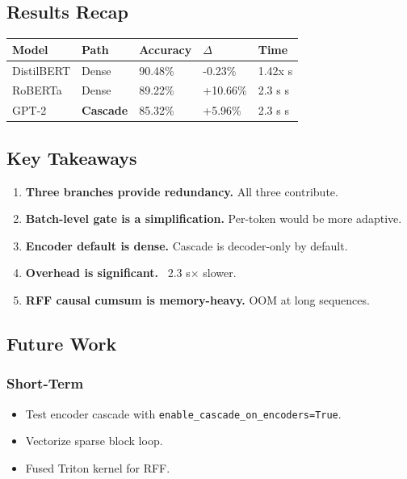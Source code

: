 \subsection{Results Recap}

\begin{table}[H]
\centering
\small
\begin{tabular}{lllll}
\toprule
\textbf{Model} & \textbf{Path} & \textbf{Accuracy} & \textbf{$\Delta$} & \textbf{Time} \\
\midrule
DistilBERT & Dense & 90.48\% & -0.23\% & 1.42x s \\
RoBERTa & Dense & 89.22\% & +10.66\% & 2.3 s s \\
GPT-2 & \textbf{Cascade} & 85.32\% & +5.96\% & 2.3 s s \\
\bottomrule
\end{tabular}
\end{table}

\subsection{Key Takeaways}

\begin{enumerate}
\item \textbf{Three branches provide redundancy.} All three contribute.
\item \textbf{Batch-level gate is a simplification.} Per-token would be more
  adaptive.
\item \textbf{Encoder default is dense.} Cascade is decoder-only by default.
\item \textbf{Overhead is significant.} ~2.3 s$\times$ slower.
\item \textbf{RFF causal cumsum is memory-heavy.} OOM at long sequences.

\end{enumerate}
\subsection{Future Work}

\subsubsection{Short-Term}

\begin{itemize}
\item Test encoder cascade with \texttt{enable\_cascade\_on\_encoders=True}.
\item Vectorize sparse block loop.
\item Fused Triton kernel for RFF.

\end{itemize}

